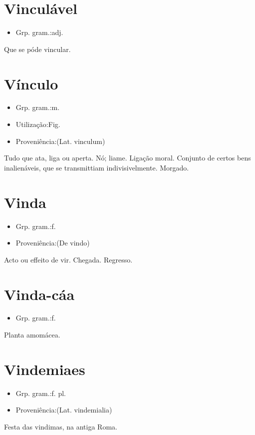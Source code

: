 \documentclass{article}
\begin{document}
\section{Vinculável}
\begin{itemize}
\item {Grp. gram.:adj.}
\end{itemize}
Que se póde vincular.
\section{Vínculo}
\begin{itemize}
\item {Grp. gram.:m.}
\end{itemize}
\begin{itemize}
\item {Utilização:Fig.}
\end{itemize}
\begin{itemize}
\item {Proveniência:(Lat. \textunderscore vinculum\textunderscore )}
\end{itemize}
Tudo que ata, liga ou aperta.
Nó; liame.
Ligação moral.
Conjunto de certos bens inalienáveis, que se transmittiam indivisivelmente.
Morgado.
\section{Vinda}
\begin{itemize}
\item {Grp. gram.:f.}
\end{itemize}
\begin{itemize}
\item {Proveniência:(De \textunderscore vindo\textunderscore )}
\end{itemize}
Acto ou effeito de vir.
Chegada.
Regresso.
\section{Vinda-cáa}
\begin{itemize}
\item {Grp. gram.:f.}
\end{itemize}
Planta amomácea.
\section{Vindemiaes}
\begin{itemize}
\item {Grp. gram.:f. pl.}
\end{itemize}
\begin{itemize}
\item {Proveniência:(Lat. \textunderscore vindemialia\textunderscore )}
\end{itemize}
Festa das vindimas, na antiga Roma.
\end{document}

